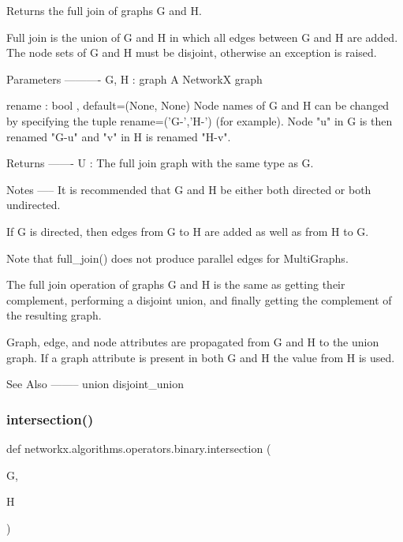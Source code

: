 \begin{DoxyVerb}Returns the full join of graphs G and H.

Full join is the union of G and H in which all edges between
G and H are added.
The node sets of G and H must be disjoint,
otherwise an exception is raised.

Parameters
----------
G, H : graph
   A NetworkX graph

rename : bool , default=(None, None)
   Node names of G and H can be changed by specifying the tuple
   rename=('G-','H-') (for example).  Node "u" in G is then renamed
   "G-u" and "v" in H is renamed "H-v".

Returns
-------
U : The full join graph with the same type as G.

Notes
-----
It is recommended that G and H be either both directed or both undirected.

If G is directed, then edges from G to H are added as well as from H to G.

Note that full_join() does not produce parallel edges for MultiGraphs.

The full join operation of graphs G and H is the same as getting
their complement, performing a disjoint union, and finally getting
the complement of the resulting graph.

Graph, edge, and node attributes are propagated from G and H
to the union graph.  If a graph attribute is present in both
G and H the value from H is used.

See Also
--------
union
disjoint_union
\end{DoxyVerb}
 \mbox{\label{namespacenetworkx_1_1algorithms_1_1operators_1_1binary_adbc0da1f63a3b76f5180a315493b2045}} 
\subsubsection{\texorpdfstring{intersection()}{intersection()}}
{\footnotesize\ttfamily def networkx.\+algorithms.\+operators.\+binary.\+intersection (\begin{DoxyParamCaption}\item[{}]{G,  }\item[{}]{H }\end{DoxyParamCaption})}

